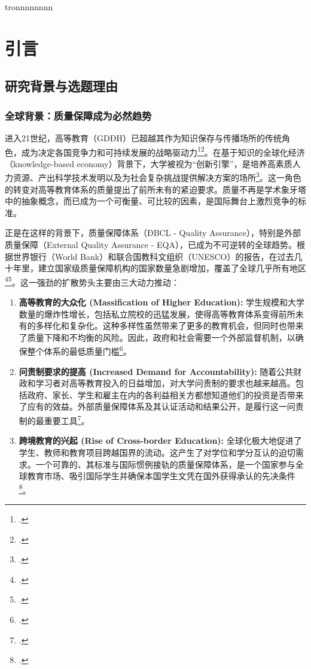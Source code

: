 tronnnnnnnn

\chapter{引言}
\label{chap:gioi_thieu}

\section{研究背景与选题理由}
\label{sec:boi_canh_ly_do}

\subsection{全球背景：质量保障成为必然趋势}

进入21世纪，高等教育（GDĐH）已超越其作为知识保存与传播场所的传统角色，成为决定各国竞争力和可持续发展的战略驱动力\footcite{Altbach2001}\footcite{WB_KnowledgeEconomy}。在基于知识的全球化经济（knowledge-based economy）背景下，大学被视为“创新引擎”，是培养高素质人力资源、产出科学技术发明以及为社会复杂挑战提供解决方案的场所\footcite{OECD_HE2008}。这一角色的转变对高等教育体系的质量提出了前所未有的紧迫要求。质量不再是学术象牙塔中的抽象概念，而已成为一个可衡量、可比较的因素，是国际舞台上激烈竞争的标准。

正是在这样的背景下，质量保障体系（ĐBCL - Quality Assurance），特别是外部质量保障（External Quality Assurance - EQA），已成为不可逆转的全球趋势。根据世界银行（World Bank）和联合国教科文组织（UNESCO）的报告，在过去几十年里，建立国家级质量保障机构的国家数量急剧增加，覆盖了全球几乎所有地区\footcite{WorldBank_QA_GlobalTrends}\footcite{UNESCO_QA2018}。这一强劲的扩散势头主要由三大动力推动：

\begin{enumerate}
    \item \textbf{高等教育的大众化 (Massification of Higher Education):} 学生规模和大学数量的爆炸性增长，包括私立院校的迅猛发展，使得高等教育体系变得前所未有的多样化和复杂化。这种多样性虽然带来了更多的教育机会，但同时也带来了质量下降和不均衡的风险。因此，政府和社会需要一个外部监督机制，以确保整个体系的最低质量门槛\footcite{Trow2007}。
    
    \item \textbf{问责制要求的提高 (Increased Demand for Accountability):} 随着公共财政和学习者对高等教育投入的日益增加，对大学问责制的要求也越来越高。包括政府、家长、学生和雇主在内的各利益相关方都想知道他们的投资是否带来了应有的效益。外部质量保障体系及其认证活动和结果公开，是履行这一问责制的最重要工具\footcite{Harvey2005}。
    
    \item \textbf{跨境教育的兴起 (Rise of Cross-border Education):} 全球化极大地促进了学生、教师和教育项目跨越国界的流动。这产生了对学位和学分互认的迫切需求。一个可靠的、其标准与国际惯例接轨的质量保障体系，是一个国家参与全球教育市场、吸引国际学生并确保本国学生文凭在国外获得承认的先决条件\footcite{Knight2006}。
\end{enumerate}

